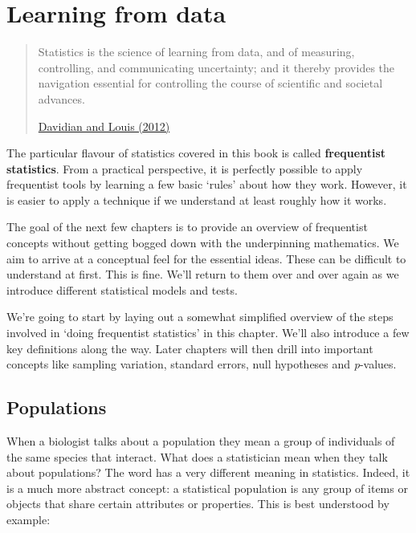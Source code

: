 \documentclass[
]{book}
\begin{document}
\hypertarget{learning-from-data}{%
\chapter{Learning from data}\label{learning-from-data}}

\begin{quote}
Statistics is the science of learning from data, and of measuring, controlling, and communicating uncertainty; and it thereby provides the navigation essential for controlling the course of scientific and societal advances.

\href{https://doi.org/10.1126/science.1218685}{Davidian and Louis (2012)}
\end{quote}

The particular flavour of statistics covered in this book is called \textbf{frequentist statistics}. From a practical perspective, it is perfectly possible to apply frequentist tools by learning a few basic `rules' about how they work. However, it is easier to apply a technique if we understand at least roughly how it works.

The goal of the next few chapters is to provide an overview of frequentist concepts without getting bogged down with the underpinning mathematics. We aim to arrive at a conceptual feel for the essential ideas. These can be difficult to understand at first. This is fine. We'll return to them over and over again as we introduce different statistical models and tests.

We're going to start by laying out a somewhat simplified overview of the steps involved in `doing frequentist statistics' in this chapter. We'll also introduce a few key definitions along the way. Later chapters will then drill into important concepts like sampling variation, standard errors, null hypotheses and \emph{p}-values.

\hypertarget{populations}{%
\section{Populations}\label{populations}}

When a biologist talks about a population they mean a group of individuals of the same species that interact. What does a statistician mean when they talk about populations? The word has a very different meaning in statistics. Indeed, it is a much more abstract concept: a statistical population is any group of items or objects that share certain attributes or properties. This is best understood by example:
\end{document}
